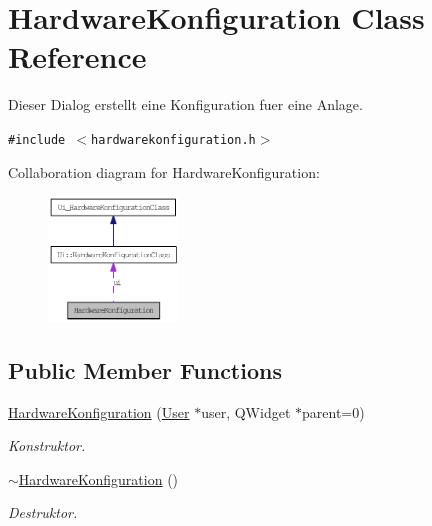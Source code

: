 \hypertarget{class_hardware_konfiguration}{
\section{HardwareKonfiguration Class Reference}
\label{class_hardware_konfiguration}
}
Dieser Dialog erstellt eine Konfiguration fuer eine Anlage.  


{\tt \#include $<$hardwarekonfiguration.h$>$}

Collaboration diagram for HardwareKonfiguration:\nopagebreak
\begin{figure}[H]
\begin{center}
\leavevmode
\includegraphics[width=98pt]{class_hardware_konfiguration__coll__graph}
\end{center}
\end{figure}
\subsection*{Public Member Functions}
\begin{CompactItemize}
\item 
\hyperlink{class_hardware_konfiguration_2872e94ce344a468b351bd1e00353760}{HardwareKonfiguration} (\hyperlink{class_user}{User} $\ast$user, QWidget $\ast$parent=0)
\begin{CompactList}\small\item\em Konstruktor. \item\end{CompactList}\item 
\hyperlink{class_hardware_konfiguration_309954982d345e65f8ac5fa6c9489ce5}{$\sim$HardwareKonfiguration} ()
\begin{CompactList}\small\item\em Destruktor. \item\end{CompactList}\end{CompactItemize}
